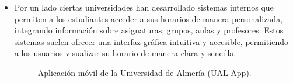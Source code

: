 \begin{itemize}
      \item Por un lado ciertas universidades han desarrollado sistemas internos que permiten a los estudiantes acceder a sus horarios de manera personalizada, integrando información sobre asignaturas, grupos, aulas y profesores. Estos sistemas suelen ofrecer una interfaz gráfica intuitiva y accesible,
      permitiendo a los usuarios visualizar su horario de manera clara y sencilla. 


      \begin{figure}[H]
            \centering
            \caption{Aplicación móvil de la Universidad de Almería (UAL App).}
            \label{fig:ual_app}
        \end{figure}


\end{itemize}
